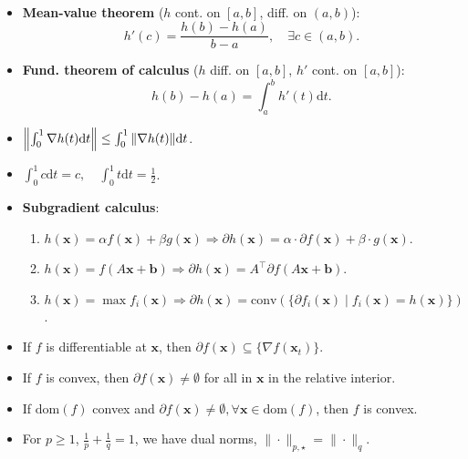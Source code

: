 \documentclass[8pt,a4paper]{extarticle}
\newcommand{\lft}{\mathopen{}\mathclose\bgroup\left}
\newcommand{\rgt}{\aftergroup\egroup\right}
\renewcommand{\vec}[1]{\bm{#1}}
\newcommand{\mat}[1]{#1}
\newcommand{\transpose}[1]{#1^\top}
\newcommand{\dom}[1]{\mathrm{dom}(#1)}
\newenvironment{topic}[1]
{\textbf{\sffamily \colorbox{black}{\rlap{\textbf{\textcolor{white}{#1}}}\hspace{\linewidth}\hspace{-2\fboxsep}}} \\ \vspace{0.2cm}}
{}
\begin{document}
\begin{multicols*}{2}
\begin{topic}{Lemmas}
\begin{itemize}
            \item \textbf{Mean-value theorem} ($h$ cont. on $[a,b]$, diff. on $(a,b)$): \[
                      h'(c) = \frac{h(b) - h(a)}{b-a}, \quad \exists c \in (a,b).
                  \]
            \item \textbf{Fund. theorem of calculus} ($h$ diff. on $[a,b]$, $h'$ cont. on $[a,b]$): \[
                      h(b) - h(a) = \int_a^b h'(t) \mathrm{d}t.
                  \]
            \item $\lft\| \int_0^1 \nabla h(t) \mathrm{d}t \rgt\| \leq \int_0^1 \| \nabla h(t) \| \mathrm{d}t$.
            \item $\int_0^1 c \mathrm{d}t = c, \quad \int_0^1 t \mathrm{d}t = \frac{1}{2}$.
            \item \textbf{Subgradient calculus}:
                  \begin{enumerate}
                      \item $h(\vec{x}) = \alpha f(\vec{x}) + \beta g(\vec{x}) \Rightarrow \partial h(\vec{x}) = \alpha \cdot \partial f(\vec{x}) + \beta \cdot g(\vec{x})$.
                      \item $h(\vec{x}) = f(\mat{A} \vec{x} + \vec{b}) \Rightarrow \partial h(\vec{x}) = \transpose{\mat{A}} \partial f(\mat{A} \vec{x} + \vec{b})$.
                      \item $h(\vec{x}) = \max f_i(\vec{x}) \Rightarrow \partial h(\vec{x}) = \mathrm{conv}(\{ \partial f_i(\vec{x}) \mid f_i(\vec{x}) = h(\vec{x}) \})$.
                  \end{enumerate}
            \item If $f$ is differentiable at $\vec{x}$, then $\partial f(\vec{x}) \subseteq \{ \nabla f(\vec{x}_t)
                      \}$.
            \item If $f$ is convex, then $\partial f(\vec{x}) \neq \emptyset$ for all in $\vec{x}$ in the relative
                  interior.
            \item If $\dom{f}$ convex and $\partial f(\vec{x}) \neq \emptyset,\forall \vec{x} \in \dom{f}$, then $f$
                  is convex.
            \item For $p \geq 1$, $\frac{1}{p} + \frac{1}{q} = 1$, we have dual norms, $\| \cdot \|_{p,\star} = \|
                      \cdot \|_q$.
        \end{itemize}
    \end{topic}


\end{multicols*}
\end{document}

